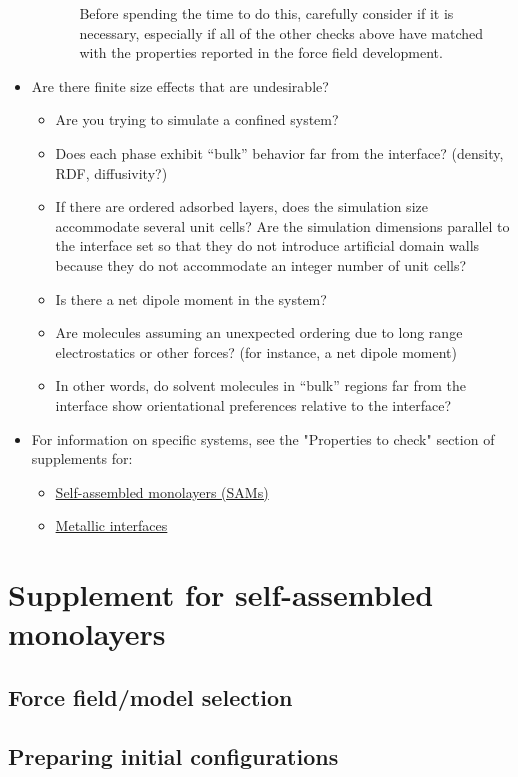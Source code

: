 \documentclass[9pt]{livecoms}
\begin{document}
\begin{itemize}
\begin{itemize}
\begin{itemize}
			Before spending the time to do this, carefully consider if it is necessary, especially if all of the other checks above have matched with the properties reported in the force field development.
		\end{itemize}
	\end{itemize}
	\item Are there finite size effects that are undesirable?
	\begin{itemize}
		\item Are you trying to simulate a confined system?
		\item Does each phase exhibit “bulk” behavior far from the interface? (density, RDF, diffusivity?)
		\item If there are ordered adsorbed layers, does the simulation size accommodate several unit cells? 
		Are the simulation dimensions parallel to the interface set so that they do not introduce artificial domain walls because they do not accommodate an integer number of unit cells?
		\item Is there a net dipole moment in the system?
		\item Are molecules assuming an unexpected ordering due to long range electrostatics or other forces? 
		(for instance, a net dipole moment)
		\item In other words, do solvent molecules in “bulk” regions far from the interface show orientational preferences relative to the interface?
	\end{itemize}
	\item For information on specific systems, see the "Properties to check" section of supplements for:
	\begin{itemize}
		\item \hyperref[subsec:SAMCheck]{Self-assembled monolayers (SAMs)}
		\item \hyperref[subsec:MetCheck]{Metallic interfaces}
	\end{itemize}
\end{itemize}

\section{Supplement for self-assembled monolayers}
\label{sec:SAM}

\subsection{Force field/model selection}
\label{subsec:SAMFF}
\subsection{Preparing initial configurations}
\label{subsec:SAMPrep}
\end{document}
